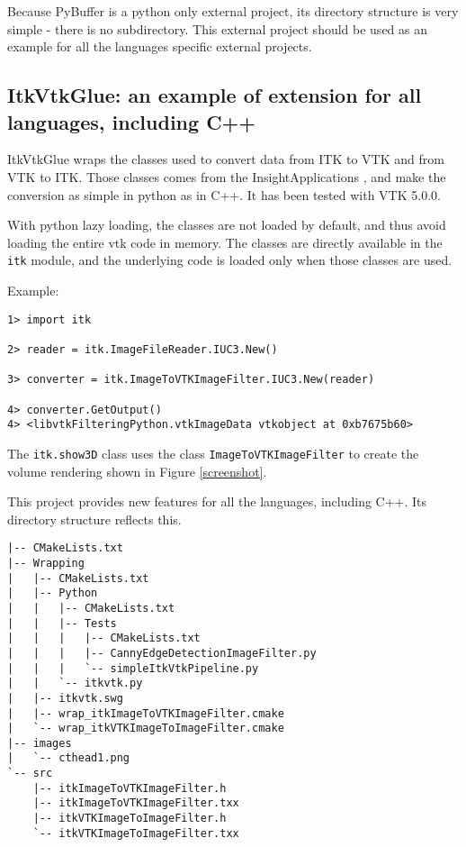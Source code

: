 \documentclass{InsightArticle}
\begin{document}
Because PyBuffer is a python only external project, its directory structure is very
simple - there is no subdirectory. This external project should be used as an example
for all the languages specific external projects.

    \subsection{ItkVtkGlue: an example of extension for all languages, including C++}

ItkVtkGlue wraps the classes used to convert data from ITK to VTK \cite{VtkWebSite} and from VTK to ITK.
Those classes comes from the InsightApplications \cite{ITKWebSite}, and make the conversion
as simple in python as in C++. It has been tested with VTK 5.0.0.

With python lazy loading, the classes are not loaded by default, and thus avoid
loading the entire vtk code in memory. The classes are directly available in the
\verb$itk$ module, and the underlying code is loaded only when those classes are used.

Example:
\begin{verbatim}
1> import itk

2> reader = itk.ImageFileReader.IUC3.New()

3> converter = itk.ImageToVTKImageFilter.IUC3.New(reader)

4> converter.GetOutput()
4> <libvtkFilteringPython.vtkImageData vtkobject at 0xb7675b60>
\end{verbatim}

The \verb$itk.show3D$ class uses the class \verb$ImageToVTKImageFilter$ to create the
volume rendering shown in Figure \ref{screenshot}.

This project provides new features for all the languages, including C++.
Its directory structure reflects this. 

\begin{verbatim}
|-- CMakeLists.txt
|-- Wrapping
|   |-- CMakeLists.txt
|   |-- Python
|   |   |-- CMakeLists.txt
|   |   |-- Tests
|   |   |   |-- CMakeLists.txt
|   |   |   |-- CannyEdgeDetectionImageFilter.py
|   |   |   `-- simpleItkVtkPipeline.py
|   |   `-- itkvtk.py
|   |-- itkvtk.swg
|   |-- wrap_itkImageToVTKImageFilter.cmake
|   `-- wrap_itkVTKImageToImageFilter.cmake
|-- images
|   `-- cthead1.png
`-- src
    |-- itkImageToVTKImageFilter.h
    |-- itkImageToVTKImageFilter.txx
    |-- itkVTKImageToImageFilter.h
    `-- itkVTKImageToImageFilter.txx
\end{verbatim}
\end{document}
